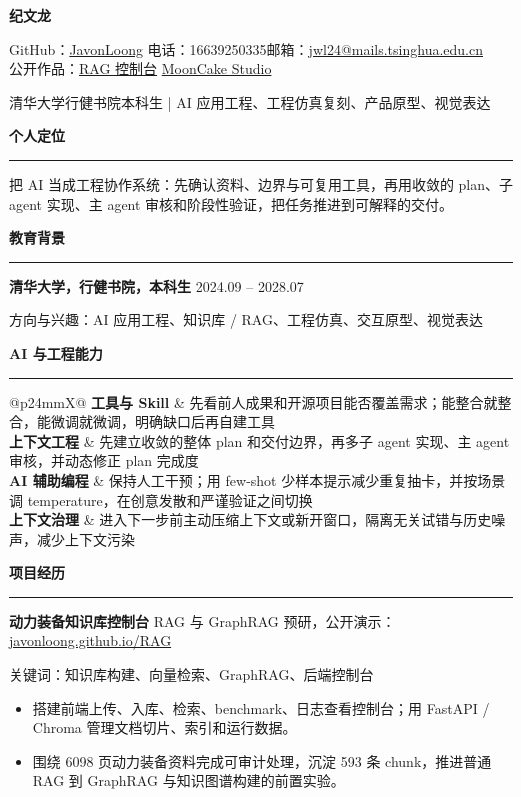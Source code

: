 \documentclass[UTF8,zihao=false]{ctexart}
\newcommand{\sectiontitle}[1]{%
  \vspace{3.2pt}
  {\fontsize{10.7pt}{12.4pt}\selectfont\bfseries\color{accent}#1}\par
  \vspace{-3pt}
  \textcolor{line}{\rule{\linewidth}{0.45pt}}
  \vspace{1pt}
}
\newcommand{\entry}[3]{%
  {\fontsize{9.35pt}{10.7pt}\selectfont\bfseries #1}%
  \hfill
  {\fontsize{8.25pt}{9.7pt}\selectfont\color{muted}#2}\par
  {\fontsize{8.35pt}{9.7pt}\selectfont\color{muted}#3}\par
}
\newcommand{\project}[4]{%
  \vspace{1.3pt}
  {\fontsize{8.95pt}{10.4pt}\selectfont\bfseries #1}
  \hfill
  {\fontsize{7.95pt}{9.2pt}\selectfont\color{muted}#2}\par
  {\fontsize{8.05pt}{9.3pt}\selectfont\color{muted}#3}\par
  \begin{itemize}
    #4
  \end{itemize}
}
\newcommand{\skillrow}[2]{%
  {\fontsize{8.35pt}{9.7pt}\selectfont\bfseries #1} &
  {\fontsize{8.35pt}{9.7pt}\selectfont #2}\\
}
\begin{document}
\begin{minipage}[t]{0.44\linewidth}
{\fontsize{23pt}{26pt}\selectfont\bfseries 纪文龙}
\end{minipage}\hfill
\begin{minipage}[t]{0.54\linewidth}
\raggedleft
{\fontsize{8.7pt}{10.4pt}\selectfont
GitHub：\href{https://github.com/JavonLoong}{JavonLoong}\quad
电话：16639250335\quad 邮箱：\href{mailto:jwl24@mails.tsinghua.edu.cn}{jwl24@mails.tsinghua.edu.cn}\\
公开作品：\href{https://javonloong.github.io/RAG/}{RAG 控制台}\quad
\href{https://javonloong.github.io/Mooncake-Modle/}{MoonCake Studio}}
\end{minipage}

\vspace{3pt}
{\fontsize{9.75pt}{11.2pt}\selectfont
清华大学行健书院本科生 \quad | \quad AI 应用工程、工程仿真复刻、产品原型、视觉表达
}

\sectiontitle{个人定位}
{\fontsize{8.45pt}{9.9pt}\selectfont
把 AI 当成工程协作系统：先确认资料、边界与可复用工具，再用收敛的 plan、子 agent 实现、主 agent 审核和阶段性验证，把任务推进到可解释的交付。
}

\sectiontitle{教育背景}
\entry{清华大学，行健书院，本科生}{2024.09 -- 2028.07}{方向与兴趣：AI 应用工程、知识库 / RAG、工程仿真、交互原型、视觉表达}

\sectiontitle{AI 与工程能力}
\begin{tabularx}{\linewidth}{@{}p{24mm}X@{}}
\skillrow{工具与 Skill}{先看前人成果和开源项目能否覆盖需求；能整合就整合，能微调就微调，明确缺口后再自建工具}
\skillrow{上下文工程}{先建立收敛的整体 plan 和交付边界，再多子 agent 实现、主 agent 审核，并动态修正 plan 完成度}
\skillrow{AI 辅助编程}{保持人工干预；用 few-shot 少样本提示减少重复抽卡，并按场景调 temperature，在创意发散和严谨验证之间切换}
\skillrow{上下文治理}{进入下一步前主动压缩上下文或新开窗口，隔离无关试错与历史噪声，减少上下文污染}
\end{tabularx}

\sectiontitle{项目经历}
\project{动力装备知识库控制台}{RAG 与 GraphRAG 预研，公开演示：\href{https://javonloong.github.io/RAG/}{javonloong.github.io/RAG}}
{关键词：知识库构建、向量检索、GraphRAG、后端控制台}
{
  \item 搭建前端上传、入库、检索、benchmark、日志查看控制台；用 FastAPI / Chroma 管理文档切片、索引和运行数据。
  \item 围绕 6098 页动力装备资料完成可审计处理，沉淀 593 条 chunk，推进普通 RAG 到 GraphRAG 与知识图谱构建的前置实验。
}
\end{document}

